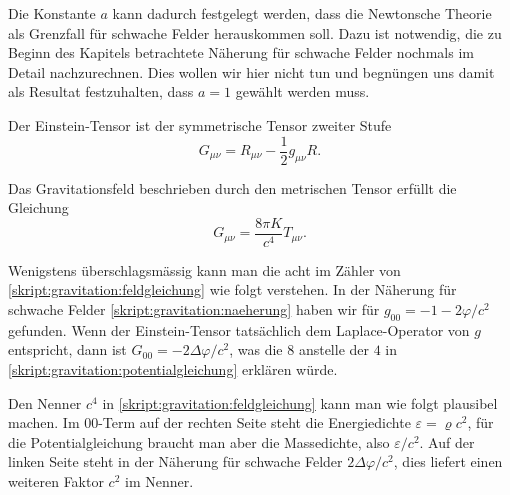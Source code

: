 Die Konstante $a$ kann dadurch festgelegt werden, dass die Newtonsche
Theorie als Grenzfall für schwache Felder herauskommen soll.
Dazu ist notwendig, die zu Beginn des Kapitels betrachtete Näherung für
schwache Felder nochmals im Detail nachzurechnen.
Dies wollen wir hier nicht tun und begnüngen uns damit als Resultat
festzuhalten, dass $a=1$ gewählt werden muss.

\begin{definition}
Der Einstein-Tensor ist der symmetrische Tensor zweiter Stufe
\begin{equation}
G_{\mu\nu} = R_{\mu\nu} - \frac12g_{\mu\nu}R.
\end{equation}
\end{definition}
%

\begin{satz}[Einstein]
Das Gravitationsfeld beschrieben durch den metrischen Tensor erfüllt
die Gleichung
\begin{equation}
G_{\mu\nu} = \frac{8\pi K}{c^4} T_{\mu\nu}.
\label{skript:gravitation:feldgleichung}
\end{equation}
\end{satz}
Wenigstens überschlagsmässig kann man die acht im Zähler von
\eqref{skript:gravitation:feldgleichung}
wie folgt verstehen.
In der Näherung für schwache Felder \eqref{skript:gravitation:naeherung}
haben wir für $g_{00}=-1-2\varphi/c^2$ gefunden.
Wenn der Einstein-Tensor tatsächlich dem Laplace-Operator von $g$ entspricht,
dann ist $G_{00}=-2\Delta\varphi/c^2$, was die $8$ anstelle der $4$ in
\eqref{skript:gravitation:potentialgleichung}
erklären würde.

Den Nenner $c^4$ in
\eqref{skript:gravitation:feldgleichung}
kann man wie folgt plausibel machen.
Im $00$-Term auf der rechten Seite steht die Energiedichte
$\varepsilon=\varrho c^2$, für die Potentialgleichung braucht man
aber die Massedichte, also $\varepsilon/c^2$.
Auf der linken Seite steht in der Näherung für schwache Felder
$2\Delta\varphi/c^2$, dies liefert einen weiteren Faktor $c^2$ im Nenner.


